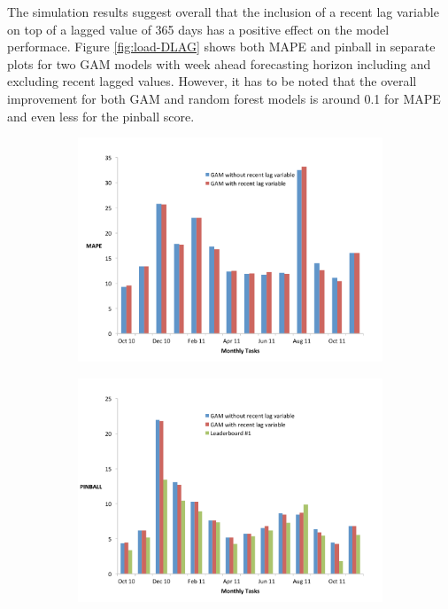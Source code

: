 \documentclass[conference]{IEEEtran}
\begin{document}
The simulation results suggest overall that the inclusion of a recent lag variable on top of a lagged value of 365 days has a positive effect on the model performace. Figure \ref{fig:load-DLAG} shows both MAPE and pinball in separate plots for two GAM models with week ahead forecasting horizon including and excluding recent lagged values. However, it has to be noted that the overall improvement for both GAM and random forest models is around 0.1 for MAPE and even less for the pinball score.
\begin{figure}[!ht]
\centering
\begin{subfigure}[b]{\linewidth}
\includegraphics[width=\linewidth]{gfx/results/load/GAM-MAPE-DLAG.pdf}
\label{subfig:DLAG1}
\end{subfigure}
\begin{subfigure}[b]{\linewidth}
\includegraphics[width=\linewidth]{gfx/results/load/GAM-PINBALL-DLAG.pdf}

\end{subfigure}
\end{figure}
\end{document}
